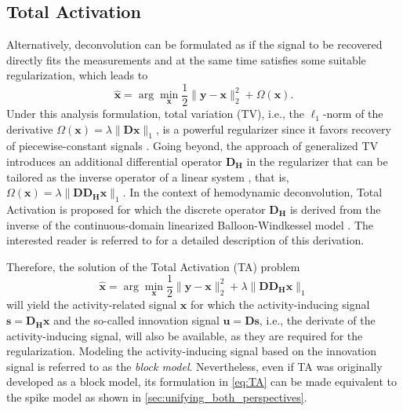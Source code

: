 \subsection{Total Activation}
Alternatively, deconvolution can be formulated as if the signal to be recovered
directly fits the measurements and at the same time satisfies some suitable
regularization, which leads to
\begin{equation}
\label{eq:analysis_model}
    \hat{\mathbf{x}} = \arg \min_{\mathbf{x}} \frac{1}{2} \| \mathbf{y} - \mathbf{x} \|_2^2 + \Omega(\mathbf{x}).
\end{equation}
Under this analysis formulation, total variation (TV), i.e., the $\ell_1$-norm
of the derivative $\Omega(\mathbf{x})=\lambda \|\mathbf{Dx}\|_1$, is a powerful
regularizer since it favors recovery of piecewise-constant signals
\citep{Chambolle2004algorithmtotalvariation}. Going beyond, the approach of
generalized TV introduces an additional differential operator $\mathbf{D_H}$ in
the regularizer that can be tailored as the inverse operator of a linear system
\citep{Karahanoglu2011SignalProcessingApproach}, that is,
$\Omega(\mathbf{x})=\lambda \|\mathbf{D D_H x}\|_1$. In the context of
hemodynamic deconvolution, Total Activation is proposed for which the discrete
operator $\mathbf{D_H}$ is derived from the inverse of the continuous-domain
linearized Balloon-Windkessel model
\citep{Buxton1998Dynamicsbloodflow,Friston2000NonlinearresponsesfMRI}. The
interested reader is referred to
\citep{Khalidov2011ActiveletsWaveletssparse,Karahanoglu2011SignalProcessingApproach,Karahanoglu2013TotalactivationfMRI}
for a detailed description of this derivation.

Therefore, the solution of the Total Activation (TA) problem
\begin{equation}
\label{eq:TA}
    \hat{\mathbf{x}} = \arg \min_{\mathbf{x}} \frac{1}{2} \| \mathbf{y} - \mathbf{x} \|_2^2 + \lambda \|\mathbf{D D_H x} \|_1
\end{equation}
will yield the activity-related signal $\mathbf{x}$ for which the
activity-inducing signal $\mathbf{s}=\mathbf{D_H x}$ and the so-called
innovation signal $\mathbf{u}=\mathbf{Ds}$, i.e., the derivate of the
activity-inducing signal, will also be available, as they are required for the
regularization. Modeling the activity-inducing signal based on the innovation
signal is referred to as the \textit{block model}. Nevertheless, even if TA was
originally developed as a block model, its formulation in \cref{eq:TA} can be
made equivalent to the spike model as shown in
\cref{sec:unifying_both_perspectives}.

